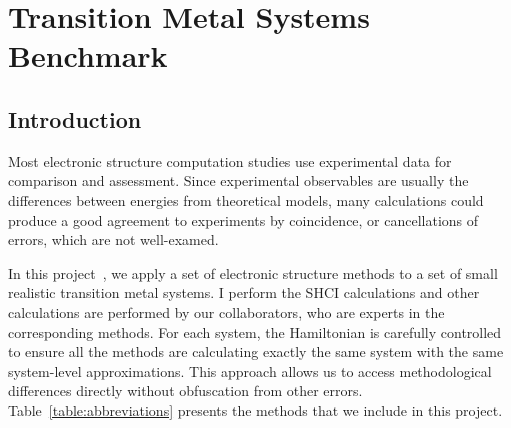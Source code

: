 \chapter{Transition Metal Systems Benchmark}
\label{ch:benchmark}
\section{Introduction}
Most electronic structure computation studies use experimental data for comparison and assessment.
Since experimental observables are usually the differences between energies from theoretical models, many calculations could produce a good agreement to experiments by coincidence, or cancellations of errors, which are not well-examed.

In this project~\cite{williams2019direct}, we apply a set of electronic structure methods to a set of small realistic transition metal systems.
I perform the SHCI calculations and other calculations are performed by our collaborators, who are experts in the corresponding methods.
For each system, the Hamiltonian is carefully controlled to ensure all the methods are calculating exactly the same system with the same system-level approximations.
This approach allows us to access methodological differences directly without obfuscation from other errors.
Table~\ref{table:abbreviations} presents the methods that we include in this project.

